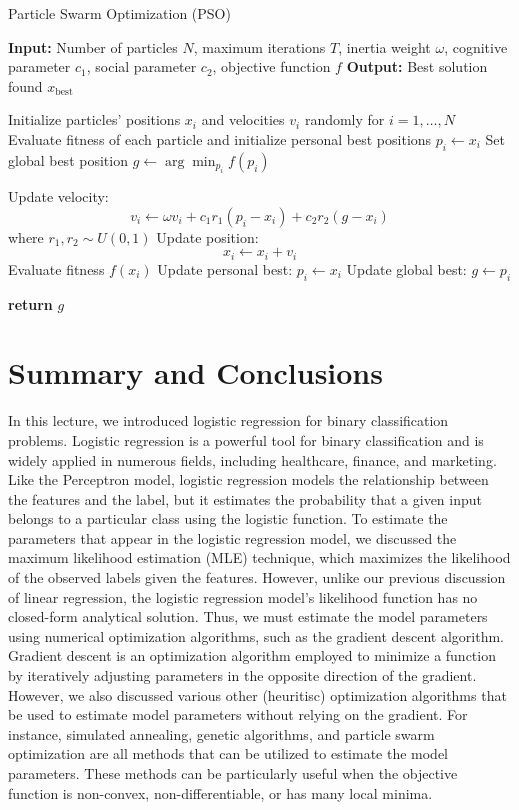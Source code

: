 \documentclass{article}[11pt]
\begin{document}
\begin{algorithm}[H]
\caption{Particle Swarm Optimization (PSO)}
\begin{algorithmic}[1]
\State \textbf{Input:} Number of particles $N$, maximum iterations $T$, inertia weight $\omega$, cognitive parameter $c_1$, social parameter $c_2$, objective function $f$
\State \textbf{Output:} Best solution found $x_\text{best}$

\State Initialize particles' positions $x_i$ and velocities $v_i$ randomly for $i = 1, \dots, N$
\State Evaluate fitness of each particle and initialize personal best positions $p_i \gets x_i$
\State Set global best position $g \gets \arg\min_{p_i} f(p_i)$

        \State Update velocity: 
        \[
        v_i \gets \omega v_i + c_1 r_1 (p_i - x_i) + c_2 r_2 (g - x_i)
        \]
        where $r_1, r_2 \sim U(0, 1)$
        \State Update position: 
        \[
        x_i \gets x_i + v_i
        \]
        \State Evaluate fitness $f(x_i)$
            \State Update personal best: $p_i \gets x_i$
        \EndIf
            \State Update global best: $g \gets p_i$
        \EndIf
    \EndFor
\EndFor

\State \textbf{return} $g$
\end{algorithmic}
\end{algorithm}


\section{Summary and Conclusions}
In this lecture, we introduced logistic regression for binary classification problems.
Logistic regression is a powerful tool for binary classification and is widely applied in numerous fields, including healthcare, finance, and marketing.
Like the Perceptron model, logistic regression models the relationship between the features and the label, but it estimates the probability that a given input belongs to a particular class using the logistic function.
To estimate the parameters that appear in the logistic regression model, we discussed the maximum likelihood estimation (MLE) technique, which maximizes the likelihood of the observed labels given the features.
However, unlike our previous discussion of linear regression, the logistic regression model's likelihood function has no closed-form analytical solution.
Thus, we must estimate the model parameters using numerical optimization algorithms, such as the gradient descent algorithm.
Gradient descent is an optimization algorithm employed to minimize a function by iteratively adjusting parameters in the opposite direction of the gradient. 
However, we also discussed various other (heuritisc) optimization algorithms that be used to estimate model parameters without relying on the gradient. 
For instance, simulated annealing, genetic algorithms, and particle swarm optimization are all methods that can be utilized to estimate the model parameters. 
These methods can be particularly useful when the objective function is non-convex, non-differentiable, or has many local minima.


\end{document}
